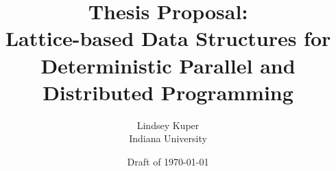 \documentclass{article}
\begin{document}
\title{Thesis Proposal: \\
  Lattice-based Data Structures for \\
  Deterministic Parallel and Distributed Programming}

\author{Lindsey Kuper \\ Indiana University}

\date{Draft of \today}

\maketitle







\end{document}
